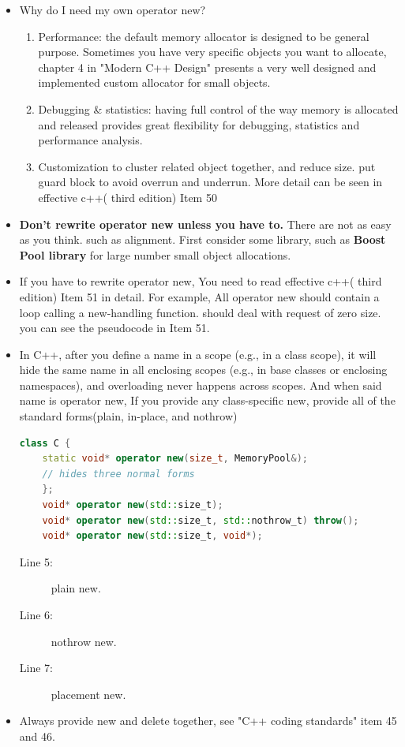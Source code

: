 \documentclass[a4paper,11pt,twoside]{book}
\begin{document}
\begin{itemize}
	\item Why do I need my own operator new?
	\begin{enumerate}
		\item Performance: the default memory allocator is designed to be general purpose. Sometimes you have very specific objects you want to allocate, chapter 4 in "Modern C++ Design" presents a very well designed and implemented custom allocator for small objects.
		
		\item Debugging \& statistics: having full control of the way memory is allocated and released provides great flexibility for debugging, statistics and performance analysis.
		
		\item Customization to cluster related object together, and reduce size. put guard block to avoid overrun and underrun. More detail can be seen in effective c++( third edition) Item 50
	\end{enumerate}
	
	\item \textbf{Don't rewrite operator new unless you have to.} There are not as easy as you think. such as alignment. First consider some library, such as \textbf{Boost Pool library} for large number small object allocations. 
	
	\item If you have to rewrite operator new, You need to read  effective c++( third edition) Item 51 in detail. For example, All operator new should contain a loop calling a new-handling function.  should deal with request of zero size. you can see the pseudocode in Item 51.
	
	\item In C++, after you define a name in a scope (e.g., in a class scope), it will hide the same name in all enclosing scopes (e.g., in base classes or enclosing namespaces), and overloading never happens across scopes. And when said name is operator new, If you provide any class-specific new, provide all of the standard forms(plain, in-place, and nothrow)
\begin{lstlisting}[frame=single, language=c++, mathescape=true]
class C {
	static void* operator new(size_t, MemoryPool&);
	// hides three normal forms
	};
	void* operator new(std::size_t);
	void* operator new(std::size_t, std::nothrow_t) throw();
	void* operator new(std::size_t, void*);
\end{lstlisting}
\begin{description}
	\item[Line 5:] plain new.
	\item[Line 6:] nothrow new.
	\item[Line 7:] placement new.
\end{description}
	
	\item Always provide new and delete together, see "C++ coding standards" item 45 and 46.
\end{itemize}
\end{document}
